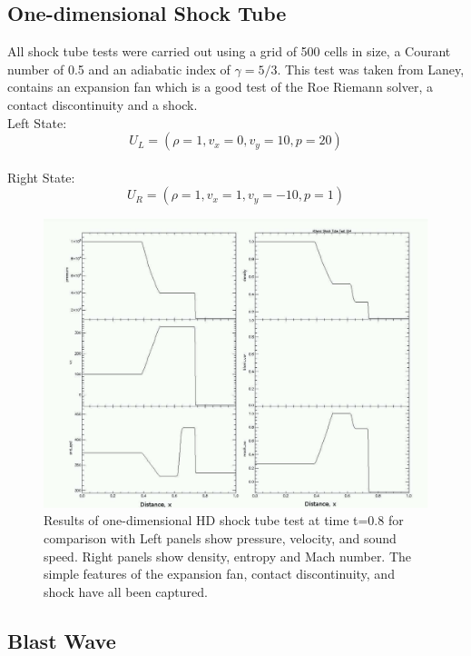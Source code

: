 \subsection{One-dimensional Shock Tube}

All shock tube tests were carried out using a grid of 500 cells in size, a Courant number of 0.5 and an adiabatic index of $\gamma=5/3$.
This test was taken from Laney, contains an expansion fan which is a good test of the Roe Riemann solver, a contact discontinuity and a shock.
\\Left State:
\begin{equation}
U_L = \left( 
\rho = 1,
v_x =0,
v_y = 10,
p = 20
\right)
\end{equation}
\\Right State:
\begin{equation}
U_R = \left( 
\rho = 1,
v_x = 1,
v_y = -10,
p = 1
\right)
\end{equation}


\begin{figure}[t]
\centering
\includegraphics[width=\textwidth]{one_d_hd_shocktube}
\caption{Results of one-dimensional HD shock tube test at time t=0.8 for comparison with \citet{Laney:1998}
Left panels show pressure, velocity, and sound speed. Right panels show density, entropy and Mach number.
The simple features of the expansion fan, contact discontinuity, and shock have all been captured.
}
\label{fig:3-1} %
\end{figure}

\subsection{Blast Wave}

